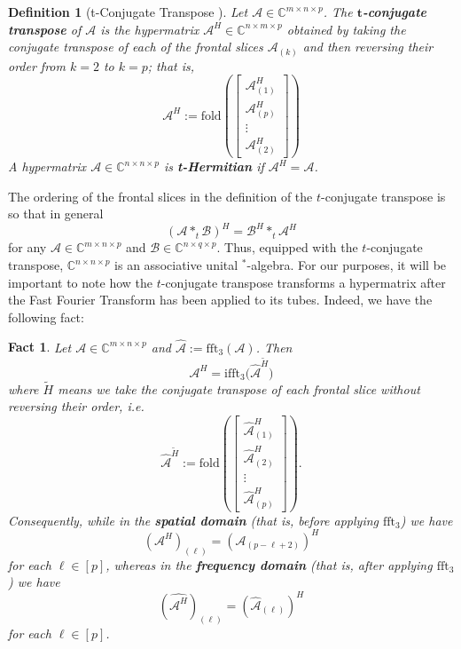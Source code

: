 \documentclass[11pt]{article}
\newtheorem{defn}[theorem]{Definition}
\newtheorem{fact}[theorem]{Fact}
\begin{document}
\begin{defn}[t-Conjugate Transpose \cite{kilmer2011factorization}]\label{t-conjugate transpose}
    Let $\mathcal{A}\in \mathbb{C}^{m\times n\times p}$. The \textbf{$\boldsymbol{t}$-conjugate transpose} of $\mathcal{A}$ is the hypermatrix $\mathcal{A}^H\in \mathbb{C}^{n\times m\times p}$ obtained by taking the conjugate transpose of each of the frontal slices $\mathcal{A}_{(k)}$ and then reversing their order from $k=2$ to $k=p$; that is, 
    \[\mathcal{A}^H := \mathrm{fold}\left(\left[\begin{array}{c}
        \mathcal{A}_{(1)}^H \\
        \mathcal{A}_{(p)}^H \\
        \vdots \\
        \mathcal{A}_{(2)}^H
    \end{array}\right]\right)\]
    A hypermatrix $\mathcal{A} \in \mathbb{C}^{n\times n\times p}$ is \textbf{t-Hermitian} if $\mathcal{A}^H = \mathcal{A}$.
\end{defn}
The ordering of the frontal slices in the definition of the $t$-conjugate transpose is so that in general 
\[(\mathcal{A}*_t\mathcal{B})^H = \mathcal{B}^H*_t\mathcal{A}^H\]
for any $\mathcal{A}\in \mathbb{C}^{m\times n\times p}$ and $\mathcal{B}\in \mathbb{C}^{n\times q\times p}$. Thus, equipped with the $t$-conjugate transpose, $\mathbb{C}^{n\times n\times p}$ is an associative unital $^*$-algebra. For our purposes, it will be important to note how the $t$-conjugate transpose transforms a hypermatrix after the Fast Fourier Transform has been applied to its tubes. Indeed, we have the following fact:
\begin{fact}\label{t-conjugate transpose in frequency domain}
    Let $\mathcal{A}\in \mathbb{C}^{m\times n\times p}$ and $\widehat{\mathcal{A}} := \mathrm{fft}_3(\mathcal{A})$. Then 
    \[\mathcal{A}^H = \mathrm{ifft}_3\Big(\widehat{\mathcal{A}}^{\widetilde{H}}\Big)\]
    where $\widetilde{H}$ means we take the conjugate transpose of each frontal slice without reversing their order, i.e. 
    \[\widehat{\mathcal{A}}^{\widetilde{H}} := \mathrm{fold}\left(\left[\begin{array}{c}
        \widehat{\mathcal{A}}_{(1)}^H \\
        \widehat{\mathcal{A}}_{(2)}^H \\
        \vdots \\
        \widehat{\mathcal{A}}_{(p)}^H
    \end{array}\right]\right).\]
    Consequently, while in the \textbf{spatial domain} (that is, before applying $\mathrm{fft}_3$) we have 
    \[\left(\mathcal{A}^H\right)_{(\ell)} = (\mathcal{A}_{(p-\ell+2)})^H\]
    for each $\ell\in [p]$, whereas in the \textbf{frequency domain} (that is, after applying $\mathrm{fft}_3$) we have 
    \begin{equation}\label{conjugate-transpose in frequency domain}
        \left(\widehat{\mathcal{A}^H}\right)_{(\ell)} = (\widehat{\mathcal{A}}_{(\ell)})^H
    \end{equation}
    for each $\ell\in [p]$. 
\end{fact}
\end{document}

